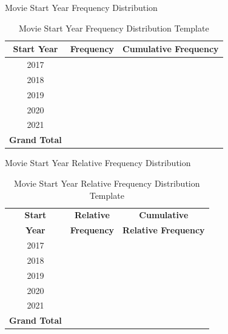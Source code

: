 \documentclass[pdf]{beamer}
\theoremstyle{remark}
\theoremstyle{definition}
\begin{document}
\begin{frame}[t]{Movie Start Year Frequency Distribution}
\begin{table}[htbp]
  \centering
  \captionsetup{justification=centering}
    \begin{tabular}{crr}
    \rowcolor[rgb]{ .851,  .882,  .949} \textbf{Start Year} & \multicolumn{1}{l}{\textbf{Frequency}} & \multicolumn{1}{l}{\textbf{Cumulative Frequency}}\\
    \midrule
    2017  & & \\
    2018  & & \\
    2019  & & \\
    2020  & & \\
    2021  & & \\
    \midrule
    \rowcolor[rgb]{ .851,  .882,  .949} \textbf{Grand Total} &  & \\
    \end{tabular}%
    \caption{Movie Start Year Frequency Distribution Template}
  \label{tab:2}%
\end{table}%
\end{frame}

\begin{frame}[t]{Movie Start Year Relative Frequency Distribution}
\begin{table}[htbp]
  \centering
  \captionsetup{justification=centering} 
    \begin{tabular}{crr}
    \rowcolor[rgb]{ .851,  .882,  .949} \textbf{Start} & \multicolumn{1}{c}{\textbf{Relative}} & \multicolumn{1}{c}{\textbf{Cumulative}}\\
       \rowcolor[rgb]{ .851,  .882,  .949}  \textbf{Year} & \multicolumn{1}{c}{\textbf{Frequency}} & \multicolumn{1}{c}{\textbf{Relative Frequency}}\\

    \midrule
    2017  &  & \\
    2018  &  & \\
    2019  &  & \\
    2020  &  & \\
    2021  &  & \\
    \midrule
    \rowcolor[rgb]{ .851,  .882,  .949} \textbf{Grand Total} &  & \\
    \end{tabular}  
  \caption{Movie Start Year Relative Frequency Distribution Template}  
  \label{tab:3}%
\end{table}%
\end{frame}
\end{document}
